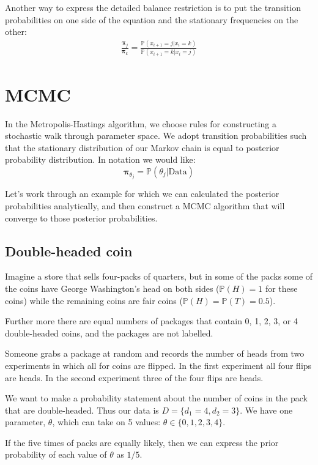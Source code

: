 \documentclass[11pt]{article}
\renewcommand{\Pr}{{\mathbb P}}
\begin{document}
Another way to express the detailed balance restriction is to put the transition probabilities on one side of the equation and the stationary frequencies on the other:
\begin{eqnarray}
	\frac{\bm \pi_j}{\bm \pi_k} = \frac{\Pr(x_{i+1} = j| x_i = k)}{\Pr(x_{i+1} = k| x_i = j)} \label{theDeetsRatio}
\end{eqnarray}


\section*{MCMC}
In the Metropolis-Hastings algorithm, we choose rules for constructing a stochastic walk through parameter space.
We adopt transition probabilities such that the stationary distribution of our Markov chain is equal to posterior probability distribution.
In notation we would like:
$$ \bm \pi_{\theta_j} = \Pr(\theta_j|\mbox{Data})$$

Let's work through an example for which we can calculated the posterior probabilities analytically, and then construct a MCMC algorithm that will converge to those posterior probabilities.

\subsection*{Double-headed coin}
Imagine a store that sells four-packs of quarters, but in some of the packs some of the coins have George Washington's head on both sides ($\Pr(H) = 1$ for these coins) while the remaining coins are fair coins ($\Pr(H)  = \Pr(T)  = 0.5$).

Further more there are equal numbers of packages that contain 0, 1, 2, 3, or 4 double-headed coins, and the packages are not labelled.

Someone grabs a package at random and records the number of heads from two experiments in which all for coins are flipped.
In the first experiment all four flips are heads.
In the second experiment three of the four flips are heads.

We want to make a probability statement about the number of coins in the pack that are double-headed.
Thus our data is $D=\{d_1=4, d_2=3\}$.
We have one parameter, $\theta$, which can take on 5 values: $\theta\in\{0,1,2,3,4\}$. 

If the five times of packs are equally likely, then we can express the prior probability of each value of $\theta$ as $1/5$.
\end{document}
